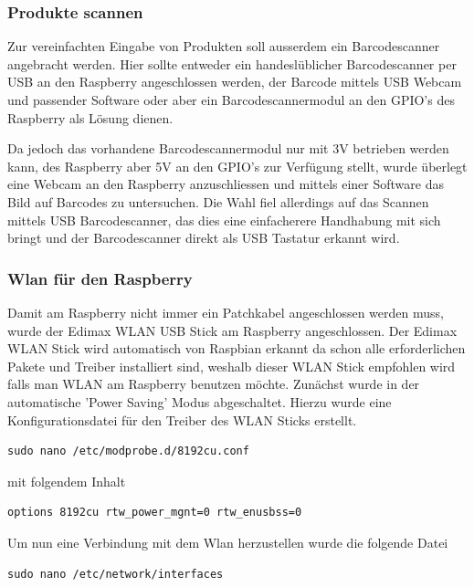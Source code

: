 \documentclass[11pt,a4paper]{article} %
\begin{document}
\subsubsection{Produkte scannen}
Zur vereinfachten Eingabe von Produkten soll ausserdem ein Barcodescanner angebracht werden. Hier sollte entweder ein handesl\"ublicher Barcodescanner per USB an den Raspberry angeschlossen werden, der Barcode mittels USB Webcam und passender Software oder aber ein Barcodescannermodul an den GPIO's des Raspberry als Lösung dienen.
\par
 Da jedoch das vorhandene Barcodescannermodul nur mit 3V betrieben werden kann, des Raspberry aber 5V an den GPIO's zur Verf\"ugung stellt, wurde überlegt eine Webcam an den Raspberry anzuschliessen und mittels einer Software das Bild auf Barcodes zu untersuchen. Die Wahl fiel allerdings auf das Scannen mittels USB Barcodescanner, das dies eine einfacherere Handhabung mit sich bringt und der Barcodescanner direkt als USB Tastatur erkannt wird.
\par
\subsubsection{Wlan für den Raspberry}
Damit am Raspberry nicht immer ein Patchkabel angeschlossen werden muss, wurde der Edimax WLAN USB Stick am Raspberry angeschlossen. Der Edimax WLAN Stick wird automatisch von Raspbian erkannt da schon alle erforderlichen Pakete und Treiber installiert sind, weshalb dieser WLAN Stick empfohlen wird falls man WLAN am Raspberry benutzen m\"ochte. Zun\"achst wurde in der automatische 'Power Saving' Modus abgeschaltet. Hierzu wurde eine Konfigurationsdatei f\"ur den Treiber des WLAN Sticks erstellt.
\begin{frame}

\begin{lstlisting}
sudo nano /etc/modprobe.d/8192cu.conf
\end{lstlisting}

\end{frame}
\par

mit folgendem Inhalt
\begin{frame}

\begin{lstlisting}
options 8192cu rtw_power_mgnt=0 rtw_enusbss=0
\end{lstlisting}

\end{frame}
\par
\par
Um nun eine Verbindung mit dem Wlan herzustellen wurde die folgende Datei
\begin{frame}

\begin{lstlisting}
sudo nano /etc/network/interfaces
\end{lstlisting}

\end{frame}
\end{document}
